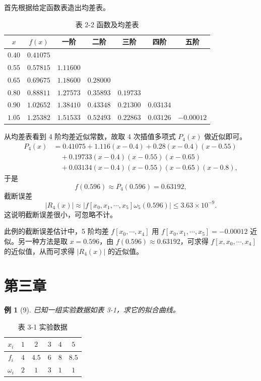 \documentclass[a4paper,12pt]{ctexart}
\theoremstyle{exampleStyle}
\newtheorem*{example}{例}
\begin{document}
首先根据给定函数表造出均差表。

\begin{table}[H]
\centering
\caption*{表 2-2 函数及均差表}
\begin{tabular}{c c c c c c c}
\toprule
$x$ & $f(x)$ & 一阶 & 二阶 & 三阶 & 四阶 & 五阶 \\
\midrule
$0.40$ & $0.41075$ & & & & & \\
$0.55$ & $0.57815$ & $1.11600$ & & & & \\
$0.65$ & $0.69675$ & $1.18600$ & $0.28000$ & & & \\
$0.80$ & $0.88811$ & $1.27573$ & $0.35893$ & $0.19733$ & & \\
$0.90$ & $1.02652$ & $1.38410$ & $0.43348$ & $0.21300$ & $0.03134$ & \\
$1.05$ & $1.25382$ & $1.51533$ & $0.52493$ & $0.22863$ & $0.03126$ & $-0.00012$ \\
\bottomrule
\end{tabular}
\end{table}

从均差表看到 4 阶均差近似常数，故取 4 次插值多项式 $P_4(x)$ 做近似即可。
\begin{align*}
P_4(x) &= 0.41075 + 1.116(x - 0.4) + 0.28(x - 0.4)(x - 0.55) \\
&\quad + 0.19733(x - 0.4)(x - 0.55)(x - 0.65) \\
&\quad + 0.03134(x - 0.4)(x - 0.55)(x - 0.65)(x - 0.8),
\end{align*}
于是
\[
f(0.596) \approx P_4(0.596) = 0.63192,
\]
截断误差
\[
|R_4(x)| \approx |f[x_0, x_1, \cdots, x_5] \omega_5(0.596)| \leqslant 3.63 \times 10^{-9}.
\]
这说明截断误差很小，可忽略不计。

此例的截断误差估计中，5 阶均差 $f[x_0, \cdots, x_4]$ 用 $f[x_0, x_1, \cdots, x_5] = -0.00012$ 近似。另一种方法是取 $x = 0.596$，由 $f(0.596) \approx 0.63192$，可求得 $f[x, x_0, \cdots, x_4]$ 的近似值，从而可求得 $|R_4(x)|$ 的近似值。

\section*{第三章}

\begin{example}[9]
已知一组实验数据如表 3-1，求它的拟合曲线。
\end{example}

\begin{table}[H]
\centering
\caption*{表 3-1 实验数据}
\begin{tabular}{c c c c c c}
\toprule
$x_i$ & $1$ & $2$ & $3$ & $4$ & $5$ \\
\midrule
$f_i$ & $4$ & $4.5$ & $6$ & $8$ & $8.5$ \\
$\omega_i$ & $2$ & $1$ & $3$ & $1$ & $1$ \\
\bottomrule
\end{tabular}
\end{table}
\end{document}
